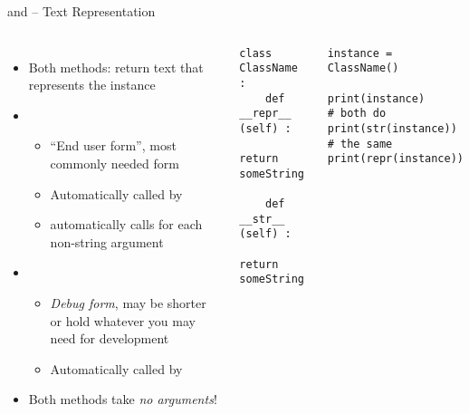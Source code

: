 
\begin{frame}[fragile]{ and  -- Text Representation}
%
\vspace{-15pt}
\begin{columns}[t]
%
\begin{itemize}
\item Both methods: return text that represents the instance
\item {}
	\begin{itemize}
	\item \enquote{End user form}, most commonly needed form
	\item Automatically called by 
	\item {} automatically calls  for each non-string argument
	\end{itemize}
\item {}
	\begin{itemize}
	\item \emph{Debug form}, may be shorter or hold whatever you may need for development
	\item Automatically called by 
	\end{itemize}
\item Both methods take \emph{no arguments}!
\end{itemize}
%
\begin{codebox}
\begin{verbatim}
class ClassName :
    def __repr__ (self) :
        return someString
    
    def __str__ (self) :
        return someString
\end{verbatim}
\end{codebox}
%
\begin{codebox}
\begin{verbatim}
instance = ClassName()

print(instance)         # both do
print(str(instance))    # the same
print(repr(instance))
\end{verbatim}
\end{codebox}
\end{columns}
%
\end{frame}

